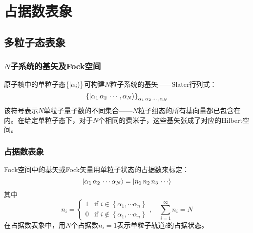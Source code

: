 \chapter{占据数表象}

\section{多粒子态表象}

\subsection{\texorpdfstring{$N$}粒子系统的基矢及Fock空间}
原子核中的单粒子态$\left\{\ket{\alpha_i}\right\}$可构建$N$粒子系统的基矢——Slater行列式：
\begin{equation}
    \left\{\ket{\alpha_1\, \alpha_2\, \cdots,\alpha_N}\right\}_{\alpha_1\, \alpha_2\, \cdots,\alpha_N}
\end{equation}
该符号表示$N$单粒子量子数的不同集合——$N$粒子组态的所有基向量都已包含在内。在给定单粒子态下，对于$N$个相同的费米子，这些基矢张成了对应的Hilbert空间。

\subsection{占据数表象}
Fock空间中的基矢或Fock矢量用单粒子状态的占据数来标定：
\begin{equation}
    \ket{\alpha_1\, \alpha_2\, \cdots\alpha_N} = \ket{n_1\, n_2\, n_3\,\cdots}
\end{equation}
其中
\begin{equation}
    n_i = \left\{\begin{array}{cc}
        1   &  \text{if\ } i \in \left\{\alpha_1, \cdots \alpha_n\right\} \\
        0  &  \text{if\ } i \notin \left\{\alpha_1, \cdots \alpha_n\right\}
    \end{array}\right.
    ,\quad
    \sum_{i = 1}^{\infty} n_i = N
\end{equation}
在占据数表象中，用$N$个占据数$n_i = 1$表示单粒子轨道$i$的占据状态。

